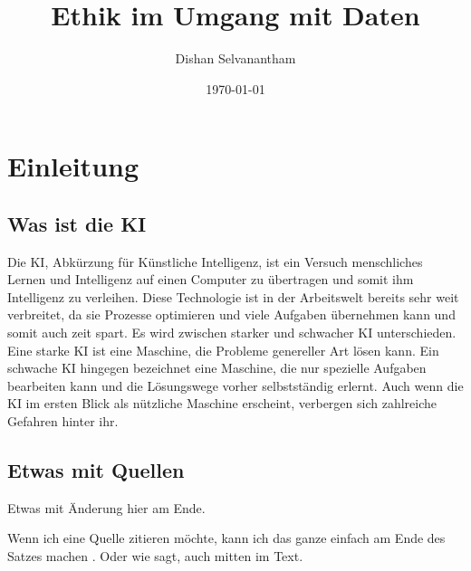 \documentclass{report}
\title{Ethik im Umgang mit Daten}
\author{Dishan Selvanantham}
\date{\today}
\begin{document}
\maketitle


\tableofcontents

\chapter{Einleitung}

\section{Was ist die KI}

Die KI, Abkürzung für Künstliche Intelligenz, ist ein Versuch menschliches Lernen und Intelligenz auf einen Computer zu übertragen und somit ihm Intelligenz zu verleihen. Diese Technologie ist in der Arbeitswelt bereits sehr weit verbreitet, da sie Prozesse optimieren und viele Aufgaben übernehmen kann und somit auch zeit spart. Es wird zwischen starker und schwacher KI unterschieden. Eine starke KI ist eine Maschine, die Probleme genereller Art lösen kann. Ein schwache KI hingegen bezeichnet eine Maschine, die nur spezielle Aufgaben bearbeiten kann und die Lösungswege vorher selbstständig erlernt. Auch wenn die KI im ersten Blick als nützliche Maschine erscheint, verbergen sich zahlreiche Gefahren hinter ihr.



\section{Etwas mit Quellen}

Etwas mit Änderung hier am Ende.

Wenn ich eine Quelle zitieren möchte, kann ich das ganze einfach am Ende des Satzes machen \citep{example}. Oder wie \citet{example} sagt, auch mitten im Text.

\printbibliography
\end{document}
